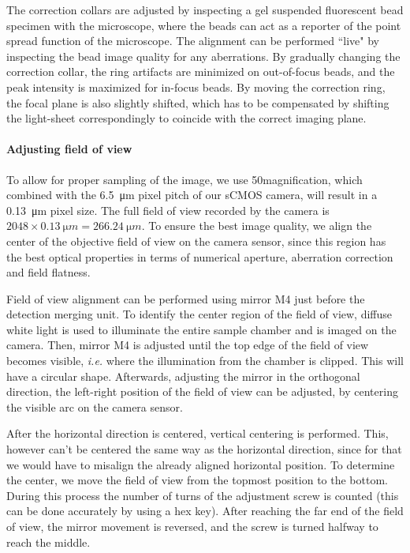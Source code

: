       The correction collars are adjusted by inspecting a gel suspended fluorescent bead specimen with the microscope, where the beads can act as a reporter of the point spread function of the microscope. The alignment can be performed ``live" by inspecting the bead image quality for any aberrations. By gradually changing the correction collar, the ring artifacts are minimized on out-of-focus beads, and the peak intensity is maximized for in-focus beads. By moving the correction ring, the focal plane is also slightly shifted, which has to be compensated by shifting the light-sheet correspondingly to coincide with the correct imaging plane.

    \paragraph{Adjusting field of view}
      To allow for proper sampling of the image, we use 50\texttimes magnification, which combined with the \SI{6.5}{\micro m} pixel pitch of our sCMOS camera, will result in a \SI{0.13}{\micro m} pixel size. The full field of view recorded by the camera is $2048 \times \SI{0.13}{\micro m} = \SI{266.24}{\micro m}$.
      To ensure the best image quality, we align the center of the objective field of view on the camera sensor, since this region has the best optical properties in terms of numerical aperture, aberration correction and field flatness.

      Field of view alignment can be performed using mirror M4 just before the detection merging unit. To identify the center region of the field of view, diffuse white light is used to illuminate the entire sample chamber and is imaged on the camera. Then, mirror M4 is adjusted until the top edge of the field of view becomes visible, \textit{i.e.} where the illumination from the chamber is clipped. This will have a circular shape. Afterwards, adjusting the mirror in the orthogonal direction, the left-right position of the field of view can be adjusted, by centering the visible arc on the camera sensor.

      After the horizontal direction is centered, vertical centering is performed. This, however can't be centered the same way as the horizontal direction, since for that we would have to misalign the already aligned horizontal position. To determine the center, we move the field of view from the topmost position to the bottom. During this process the number of  turns of the adjustment screw is counted (this can be done accurately by using a hex key). After reaching the far end of the field of view, the mirror movement is reversed, and the screw is turned halfway to reach the middle.







